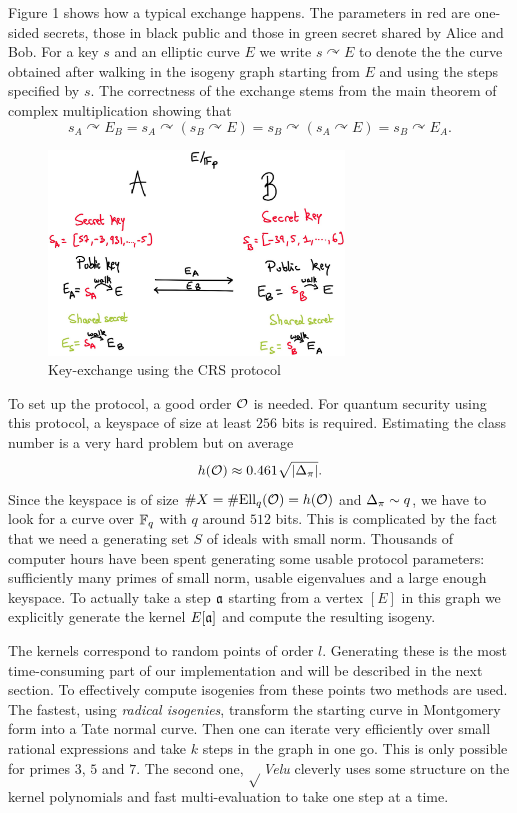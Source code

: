 \documentclass[../main/main.tex]{subfiles}
\begin{document}
Figure 1 shows how a typical exchange happens.
The parameters in red are one-sided secrets, those in black public and those in green secret shared by Alice and Bob.
For a key $s$ and an elliptic curve $E$ we write $s\curvearrowright E$ to denote the the curve obtained after walking in the isogeny graph starting from $E$ and using the steps specified by $s$.
The correctness of the exchange stems from the main theorem of complex multiplication showing that
\[
	s_A\curvearrowright E_B = s_A\curvearrowright(s_B\curvearrowright E) = s_B\curvearrowright(s_A\curvearrowright E) = s_B\curvearrowright E_A.
\]



\begin{figure}[h]
\centering
\includegraphics[width=0.7\textwidth]{dh}
\caption{Key-exchange using the CRS protocol}
\end{figure}

To set up the protocol, a good order $\mathcal{O}$ is needed.
For quantum security using this protocol, a keyspace of size at least $256$ bits is required.
Estimating the class number is a very hard problem but on average
\[
	h(\mathcal{O}) \approx 0.461\sqrt{\left|\Delta_{\pi}\right|}.
\]
Since the keyspace is of size $\# X= \# \text{Ell}_q(\mathcal{O}) = h(\mathcal{O})$ and $\Delta_{\pi}\sim q$, we have to look for a curve over $\mathbb{F}_q$ with $q$ around $512$ bits.
This is complicated by the fact that we need a generating set $S$ of ideals with small norm.
Thousands of computer hours have been spent generating some usable protocol parameters: sufficiently many primes of small norm, usable eigenvalues and a large enough keyspace.
To actually take a step $\mathfrak{a}$ starting from a vertex $[E]$ in this graph we explicitly generate the kernel $E[\mathfrak{a}]$ and compute the resulting isogeny.

The kernels correspond to random points of order $l$.
Generating these is the most time-consuming part of our implementation and will be described in the next section.
To effectively compute isogenies from these points two methods are used.
The fastest, using \textit{radical isogenies}, transform the starting curve in Montgomery form into a Tate normal curve.
Then one can iterate very efficiently over small rational expressions and take $k$ steps in the graph in one go.
This is only possible for primes $3$, $5$ and $7$.
The second one, $\sqrt{}$\textit{Velu} cleverly uses some structure on the kernel polynomials and fast multi-evaluation to take one step at a time.
\end{document}
